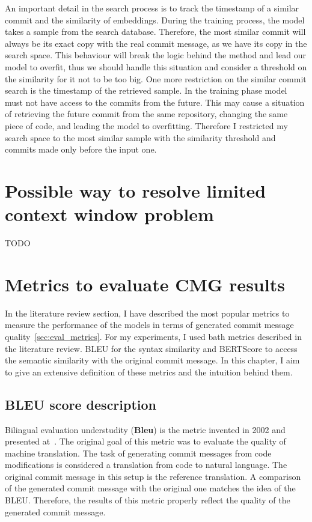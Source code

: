 An important detail in the search process is to track the timestamp of a similar commit and the similarity of embeddings.  During the training process, the model takes a sample from the search database. Therefore, the most similar commit will always be its exact copy with the real commit message, as we have its copy in the search space. This behaviour will break the logic behind the method and lead our model to overfit, thus we should handle this situation and consider a threshold on the similarity for it not to be too big. One more restriction on the similar commit search is the timestamp of the retrieved sample. In the training phase model must not have access to the commits from the future.  This may cause a situation of retrieving the future commit from the same repository, changing the same piece of code, and leading the model to overfitting. Therefore I restricted my search space to the most similar sample with the similarity threshold and commits made only before the input one.  





\section{Possible way to resolve limited context window problem}\label{sec:file_attention_arch}
TODO

\section{Metrics to evaluate CMG results}
In the literature review section, I have described the most popular metrics to measure the performance of the models in terms of generated commit message quality~\ref{sec:eval_metrics}. For my experiments, I used bath metrics described in the literature review. BLEU for the syntax similarity and BERTScore to access the semantic similarity with the original commit message. In this chapter, I aim to give an extensive definition of these metrics and the intuition behind them.

\subsection{BLEU score description}\label{subsec:bleu}
Bilingual evaluation understudity (\textbf{Bleu}) is the metric invented in 2002 and presented at~\cite{papineni2002bleu}. The original goal of this metric was to evaluate the quality of machine translation. The task of generating commit messages from code modifications is considered a translation from code to natural language. The original commit message in this setup is the reference translation. A comparison of the generated commit message with the original one matches the idea of the BLEU\@. Therefore, the results of this metric properly reflect the quality of the generated commit message. 

